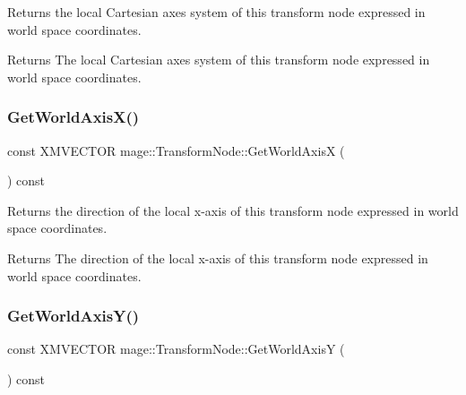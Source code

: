 Returns the local Cartesian axes system of this transform node expressed in world space coordinates.

\begin{DoxyReturn}{Returns}
The local Cartesian axes system of this transform node expressed in world space coordinates. 
\end{DoxyReturn}
\hypertarget{structmage_1_1_transform_node_a14a5604bcaa467c748f543092037ace6}{}\label{structmage_1_1_transform_node_a14a5604bcaa467c748f543092037ace6} 
\subsubsection{\texorpdfstring{Get\+World\+Axis\+X()}{GetWorldAxisX()}}
{\footnotesize\ttfamily const X\+M\+V\+E\+C\+T\+OR mage\+::\+Transform\+Node\+::\+Get\+World\+AxisX (\begin{DoxyParamCaption}{ }\end{DoxyParamCaption}) const\hspace{0.3cm}{\ttfamily [noexcept]}}

Returns the direction of the local x-\/axis of this transform node expressed in world space coordinates.

\begin{DoxyReturn}{Returns}
The direction of the local x-\/axis of this transform node expressed in world space coordinates. 
\end{DoxyReturn}
\hypertarget{structmage_1_1_transform_node_a94393cbc9a2a1270e2d52207233d6135}{}\label{structmage_1_1_transform_node_a94393cbc9a2a1270e2d52207233d6135} 
\subsubsection{\texorpdfstring{Get\+World\+Axis\+Y()}{GetWorldAxisY()}}
{\footnotesize\ttfamily const X\+M\+V\+E\+C\+T\+OR mage\+::\+Transform\+Node\+::\+Get\+World\+AxisY (\begin{DoxyParamCaption}{ }\end{DoxyParamCaption}) const\hspace{0.3cm}{\ttfamily [noexcept]}}

